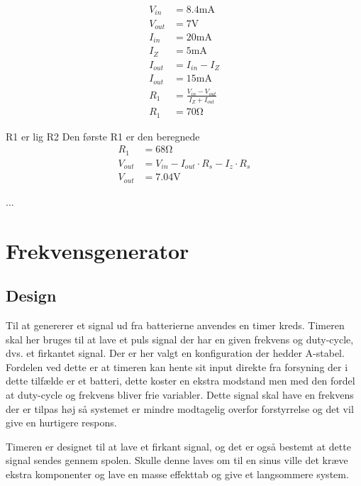 	
	\begin{align}
	V_{in} & = 8.4 \si{\milli\ampere} \nonumber \\
	V_{out} & = 7 \si{\volt} \nonumber \\
	I_{in} & = 20\si{\milli\ampere} \nonumber \\
	I_Z & = 5 \si{\milli\ampere} \nonumber \\
	I_{out} & = I_{in} - I_Z \\
	I_{out} & = 15 \si{\milli\ampere} \nonumber \\
	R_1 & = \frac{V_{in} - V_{out}}{I_Z + I_{out}} \label{eq:RegulatorModstand} \\
	R_1 & = 70 \si{\ohm} \nonumber \label{eq:RegulatorModstandBeregnet}
	\end{align}
	
	R1 er lig R2
	Den første R1 er den beregnede
	\begin{align}
	R_1 & = 68 \si{\ohm} \nonumber \\
	V_{out} & = V_{in} - I_{out} \cdot R_s - I_z \cdot R_s \\
	V_{out} & = 7.04 \si{\volt} \label{eq:RegulatorBeregnetPotentiale} 
	\end{align}
	



...

\section{Frekvensgenerator}
\subsection{Design}
Til at genererer et signal ud fra batterierne anvendes en timer kreds. 
Timeren skal her bruges til at lave et puls signal der har en given frekvens og duty-cycle, dvs. et firkantet signal. 
Der er her valgt en konfiguration der hedder A-stabel. 
Fordelen ved dette er at timeren kan hente sit input direkte fra forsyning der i dette tilfælde er et batteri, dette koster en ekstra modstand men med den fordel at duty-cycle og frekvens bliver frie variabler. 
Dette signal skal have en frekvens der er tilpas høj så systemet er mindre modtagelig overfor forstyrrelse og det vil give en hurtigere respons. 

Timeren er designet til at lave et firkant signal, og det er også bestemt at dette signal sendes gennem spolen.
Skulle denne laves om til en sinus ville det kræve ekstra komponenter og lave en masse effekttab og give et langsommere system.


